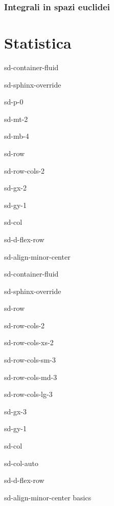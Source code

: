 \documentclass[letterpaper,10pt,italian]{jupyterBook}
\begin{document}
\section{Integrali in spazi euclidei}
\label{\detokenize{ch/vector-calculus/integrals:integrali-in-spazi-euclidei}}\label{\detokenize{ch/vector-calculus/integrals:vector-calculus-integrals}}\label{\detokenize{ch/vector-calculus/integrals::doc}}
\sphinxstepscope


\part{Statistica}

\sphinxstepscope

\begin{sphinxuseclass}{sd-container-fluid}
\begin{sphinxuseclass}{sd-sphinx-override}
\begin{sphinxuseclass}{sd-p-0}
\begin{sphinxuseclass}{sd-mt-2}
\begin{sphinxuseclass}{sd-mb-4}
\begin{sphinxuseclass}{sd-row}
\begin{sphinxuseclass}{sd-row-cols-2}
\begin{sphinxuseclass}{sd-gx-2}
\begin{sphinxuseclass}{sd-gy-1}
\begin{sphinxuseclass}{sd-col}
\begin{sphinxuseclass}{sd-d-flex-row}
\begin{sphinxuseclass}{sd-align-minor-center}
\begin{sphinxuseclass}{sd-container-fluid}
\begin{sphinxuseclass}{sd-sphinx-override}
\begin{sphinxuseclass}{sd-row}
\begin{sphinxuseclass}{sd-row-cols-2}
\begin{sphinxuseclass}{sd-row-cols-xs-2}
\begin{sphinxuseclass}{sd-row-cols-sm-3}
\begin{sphinxuseclass}{sd-row-cols-md-3}
\begin{sphinxuseclass}{sd-row-cols-lg-3}
\begin{sphinxuseclass}{sd-gx-3}
\begin{sphinxuseclass}{sd-gy-1}
\begin{sphinxuseclass}{sd-col}
\begin{sphinxuseclass}{sd-col-auto}
\begin{sphinxuseclass}{sd-d-flex-row}
\begin{sphinxuseclass}{sd-align-minor-center}
\sphinxAtStartPar
basics


\end{sphinxuseclass}
\end{sphinxuseclass}
\end{sphinxuseclass}
\end{sphinxuseclass}
\end{sphinxuseclass}
\end{sphinxuseclass}
\end{sphinxuseclass}
\end{sphinxuseclass}
\end{sphinxuseclass}
\end{sphinxuseclass}
\end{sphinxuseclass}
\end{sphinxuseclass}
\end{sphinxuseclass}
\end{sphinxuseclass}
\end{sphinxuseclass}
\end{sphinxuseclass}
\end{sphinxuseclass}
\end{sphinxuseclass}
\end{sphinxuseclass}
\end{sphinxuseclass}
\end{sphinxuseclass}
\end{sphinxuseclass}
\end{sphinxuseclass}
\end{sphinxuseclass}
\end{sphinxuseclass}
\end{sphinxuseclass}
\end{document}
